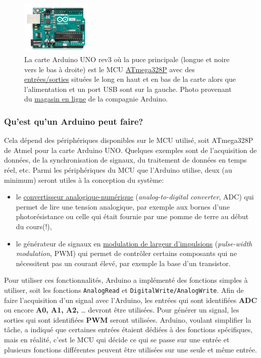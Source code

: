 \documentclass[canadien,12pt,oneside,letterpaper]{article}
\begin{document}
\begin{figure}[h]
    \centering
    \includegraphics[width=0.3\textwidth]{ArduinoUNO.jpg}
    \caption{La carte Arduino UNO rev3 où la puce principale (longue et noire vers le bas à droite) est le MCU \href{http://ww1.microchip.com/downloads/en/DeviceDoc/Atmel-7810-Automotive-Microcontrollers-ATmega328P_Datasheet.pdf}{ATmega328P} avec des \href{https://www.circuito.io/blog/arduino-uno-pinout/}{ entrées/sorties} situées le long en haut et en bas de la carte alors que l'alimentation et un port USB sont sur la gauche. Photo provenant du \href{https://store.arduino.cc/usa/}{magasin en ligne} de la compagnie Arduino.}
    \label{fig:ArduinoUNO}
\end{figure}

\subsubsection*{Qu'est qu'un Arduino peut faire?}
Cela dépend des périphériques disponibles sur le MCU utilisé, soit ATmega328P de Atmel pour la carte Arduino UNO. Quelques exemples sont de l’acquisition de données, de la synchronisation de signaux, du traitement de données en temps réel, etc. Parmi les périphériques du MCU que l’Arduino utilise, deux (au minimum) seront utiles à la conception du système:
\begin{itemize}
    \item le \href{https://en.wikipedia.org/wiki/Analog-to-digital_converter}{convertisseur analogique-numérique} (\textit{analog-to-digital converter}, ADC) qui permet de lire une tension analogique, par exemple aux bornes d’une photorésistance ou celle qui était fournie par une pomme de terre au début du cours(!),
    \item le générateur de signaux en \href{https://en.wikipedia.org/wiki/Pulse-width_modulation}{modulation de largeur d'impulsions} (\textit{pulse-width modulation}, PWM) qui permet de contrôler certains composants qui ne nécessitent pas un courant élevé, par exemple la base d’un transistor.
\end{itemize}

 Pour utiliser ces fonctionnalités, Arduino a implémenté des fonctions simples à utiliser, soit les fonctions \texttt{AnalogRead}  et \texttt{DigitalWrite/AnalogWrite}. Afin de faire l’acquisition d’un signal avec l’Arduino, les entrées qui sont identifiées \textbf{ADC} ou encore \textbf{A0, A1, A2,} … devront être utilisées. Pour générer un signal, les sorties qui sont identifiées \textbf{PWM} seront utilisées. Arduino, voulant simplifier la tâche, a indiqué que certaines entrées étaient dédiées à des fonctions spécifiques, mais en réalité, c’est le MCU qui décide ce qui se passe sur une entrée et plusieurs fonctions différentes peuvent être utilisées sur une seule et même entrée.
 
\end{document}
